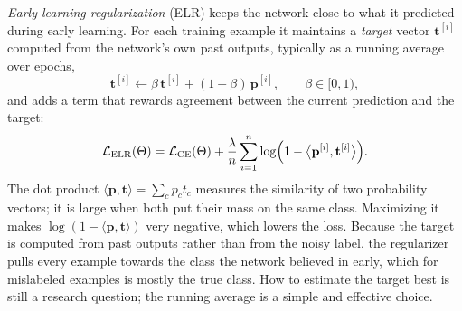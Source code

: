 \emph{Early-learning regularization} (ELR) keeps the network close to what it
predicted during early learning. For each training example it maintains a
\emph{target} vector $\mathbf t^{[i]}$ computed from the network's own past
outputs, typically as a running average over epochs,
\begin{equation}
  \mathbf t^{[i]} \leftarrow \beta\,\mathbf t^{[i]} + (1-\beta)\,\mathbf p^{[i]},
  \qquad \beta\in[0,1) ,
\end{equation}
and adds a term that rewards agreement between the current prediction and
the target:
\begin{equation}
  \mathcal L_{\mathrm{ELR}}(\Theta) = \mathcal L_{\mathrm{CE}}(\Theta)
    + \frac{\lambda}{n}\sum_{i=1}^{n}
    \log\Bigl(1-\bigl\langle \mathbf p^{[i]},\mathbf t^{[i]}\bigr\rangle\Bigr).
  \label{eq:elr}
\end{equation}
The dot product $\langle\mathbf p,\mathbf t\rangle=\sum_c p_c t_c$ measures the
similarity of two probability vectors; it is large when both put their mass
on the same class. Maximizing it makes $\log(1-\langle\mathbf p,\mathbf
t\rangle)$ very negative, which lowers the loss. Because the target is
computed from past outputs rather than from the noisy label, the regularizer
pulls every example towards the class the network believed in early, which
for mislabeled examples is mostly the true class. How to estimate the
target best is still a research question; the running average is a simple
and effective choice.

